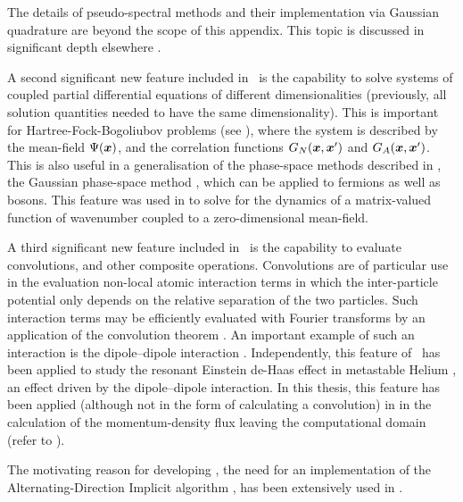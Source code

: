 The details of pseudo-spectral methods and their implementation via Gaussian quadrature are beyond the scope of this appendix.  This topic is discussed in significant depth elsewhere \citep{SpectralMethods}.

A second significant new feature included in \xpdeint\ is the capability to solve systems of coupled partial differential equations of different dimensionalities (previously, all solution quantities needed to have the same dimensionality).  This is important for Hartree-Fock-Bogoliubov problems (see ), where the system is described by the mean-field $\Psi(\bm{x})$, and the correlation functions $G_{N}(\bm{x}, \bm{x}')$ and $G_A(\bm{x}, \bm{x}')$.  This is also useful in a generalisation of the phase-space methods described in , the Gaussian phase-space method \citep{Drummond:2007,Drummond:2007a}, which can be applied to fermions as well as bosons.  This feature was used in  to solve for the dynamics of a matrix-valued function of wavenumber coupled to a zero-dimensional mean-field.

A third significant new feature included in \xpdeint\ is the capability to evaluate convolutions, and other composite operations.  Convolutions are of particular use in the evaluation non-local atomic interaction terms in which the inter-particle potential only depends on the relative separation of the two particles.  Such interaction terms may be efficiently evaluated with Fourier transforms by an application of the convolution theorem \citep{ArfkenWeber}.  An important example of such an interaction is the dipole--dipole interaction \citep{Goral:2002}.  Independently, this feature of \xpdeint\ has been applied to study the resonant Einstein de-Haas effect \citep{Gawryluk:2007} in metastable Helium \citep{Stevenson:2008}, an effect driven by the dipole--dipole interaction.  In this thesis, this feature has been applied (although not in the form of calculating a convolution) in  in the calculation of the momentum-density flux leaving the computational domain (refer to ).

The motivating reason for developing \xpdeint, the need for an implementation of the Alternating-Direction Implicit algorithm \citep{NumericalRecipes}, has been extensively used in .

